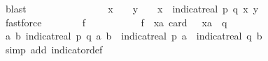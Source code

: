 \begin{isabellebody}
\ blast\isanewline
\ \ \ \ \ \ \isanewline
\ \ \ \ \ \ \isamarkupfalse%
\ \isamarkupfalse%
\ {\isachardoublequoteopen}x\ {\isasymin}\ {\isasymK}\ {\isasymand}\ y\ {\isasymin}\ {\isasymK}\ {\isacharminus}{\kern0pt}\ {\isacharbraceleft}{\kern0pt}x{\isacharbraceright}{\kern0pt}\ {\isasymand}\ {\isacharparenleft}{\kern0pt}indicat{\isacharunderscore}{\kern0pt}real\ {\isacharbraceleft}{\kern0pt}{\isacharparenleft}{\kern0pt}p{\isacharcomma}{\kern0pt}\ q{\isacharparenright}{\kern0pt}{\isacharbraceright}{\kern0pt}\ {\isacharparenleft}{\kern0pt}x{\isacharcomma}{\kern0pt}\ y{\isacharparenright}{\kern0pt}\ {\isacharequal}{\kern0pt}\ {}{\isacharparenright}{\kern0pt}{\isachardoublequoteclose}\isanewline
\ \ \ \ \ \ \ \ \isamarkupfalse%
\ fastforce\isanewline
\isanewline
\ \ \ \ \ \ \isamarkupfalse%
\ {\isacharquery}{\kern0pt}f{\isacharunderscore}{\kern0pt}{}\ {\isacharequal}{\kern0pt}\ {\isachardoublequoteopen}{\isasymlambda}{\isacharunderscore}{\kern0pt}{\isachardot}{\kern0pt}\ {}{\isachardoublequoteclose}\isanewline
\ \ \ \ \ \ \isamarkupfalse%
\ {\isacharquery}{\kern0pt}f{\isacharunderscore}{\kern0pt}{}\ {\isacharequal}{\kern0pt}\ {\isachardoublequoteopen}{\isasymlambda}xa{\isachardot}{\kern0pt}\ card\ {\isacharparenleft}{\kern0pt}{\isacharparenleft}{\kern0pt}{\isasymK}\ {\isacharminus}{\kern0pt}\ {\isacharbraceleft}{\kern0pt}xa{\isacharbraceright}{\kern0pt}{\isacharparenright}{\kern0pt}\ {\isasyminter}\ {\isacharbraceleft}{\kern0pt}q{\isacharbraceright}{\kern0pt}{\isacharparenright}{\kern0pt}\ {\isachardoublequoteclose}\isanewline
\isanewline
\ \ \ \ \ \ \isamarkupfalse%
\ {\isachardoublequoteopen}{\isasymAnd}a\ b{\isachardot}{\kern0pt}\ indicat{\isacharunderscore}{\kern0pt}real\ {\isacharbraceleft}{\kern0pt}{\isacharparenleft}{\kern0pt}p{\isacharcomma}{\kern0pt}\ q{\isacharparenright}{\kern0pt}{\isacharbraceright}{\kern0pt}\ {\isacharparenleft}{\kern0pt}a{\isacharcomma}{\kern0pt}\ b{\isacharparenright}{\kern0pt}\ {\isacharequal}{\kern0pt}\ indicat{\isacharunderscore}{\kern0pt}real\ {\isacharbraceleft}{\kern0pt}p{\isacharbraceright}{\kern0pt}\ a\ {\isacharasterisk}{\kern0pt}\ indicat{\isacharunderscore}{\kern0pt}real\ {\isacharbraceleft}{\kern0pt}q{\isacharbraceright}{\kern0pt}\ b{\isachardoublequoteclose}\ \isanewline
\ \ \ \ \ \ \ \ \isamarkupfalse%
\ {\isacharparenleft}{\kern0pt}simp\ add{\isacharcolon}{\kern0pt}\ indicator{\isacharunderscore}{\kern0pt}def{\isacharparenright}{\kern0pt}\isanewline
\ \ \ \ \ \ \isamarkupfalse%

\end{isabellebody}
